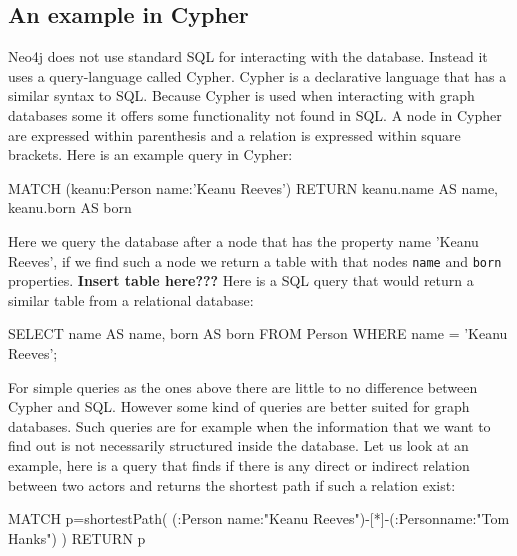 \subsection{An example in Cypher}
Neo4j does not use standard SQL for interacting with the database. Instead it uses a query-language called Cypher. Cypher is a declarative language that has a similar syntax to SQL. Because Cypher is used when interacting with graph databases some it offers some functionality not found in SQL. A node in Cypher are expressed within parenthesis and a relation is expressed within square brackets. Here is an example query in Cypher: 
\begin{sqlCode}
MATCH (keanu:Person {name:'Keanu Reeves'})
RETURN keanu.name AS name, keanu.born AS born
\end{sqlCode}
Here we query the database after a node that has the property name 'Keanu Reeves', if we find such a node we return a table with that nodes \texttt{name} and \texttt{born} properties. \textbf{Insert table here???} Here is a SQL query that would return a similar table from a relational database:
\begin{sqlCode}
SELECT 
    name AS name, 
    born AS born
FROM 
    Person
WHERE 
    name = 'Keanu Reeves';
\end{sqlCode}

For simple queries as the ones above there are little to no difference between Cypher and SQL. However some kind of queries are better suited for graph databases. Such queries are for example when the information that we want to find out is not necessarily structured inside the database. Let us look at an example, here is a query that finds if there is any direct or indirect relation between two actors and returns the shortest path if such a relation exist:

\begin{sqlCode}
MATCH p=shortestPath(
(:Person {name:"Keanu Reeves"})-[*]-(:Person{name:"Tom Hanks"})
) RETURN p
\end{sqlCode}

